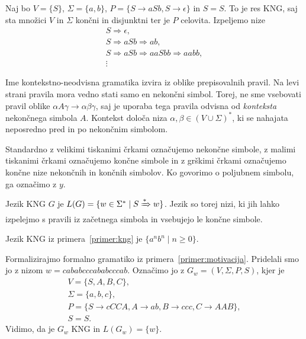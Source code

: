 \documentclass[fin1, tisk]{fmfdelo}
\theoremstyle{definition}
\begin{document}
\begin{primer}
    Naj bo $ V = \{ S\}$, 
    $\Sigma = \{ a,b \}$, 
    $P = \{ S \rightarrow aSb, S \rightarrow \epsilon \}$ in
    $S = S$.
    To je res KNG, saj sta množici $V$ in $\Sigma$ končni in disjunktni ter je $P$ celovita.
    Izpeljemo nize
    \begin{gather*}
        S \Rightarrow \epsilon, \\
        S \Rightarrow \mathit{aSb} \Rightarrow \mathit{ab}, \\
        S \Rightarrow \mathit{aSb} \Rightarrow \mathit{aaSbb} \Rightarrow \mathit{aabb}, \\
        \vdots
    \end{gather*}
\end{primer}

Ime kontekstno-neodvisna gramatika izvira iz oblike prepisovalnih pravil. Na levi strani 
pravila mora vedno stati samo en nekončni simbol. Torej, ne sme vsebovati pravil oblike 
$\alpha A \gamma \rightarrow \alpha\beta\gamma$, saj je uporaba tega pravila odvisna od 
\emph{konteksta} nekončnega simbola $A$. Kontekst določa niza 
$\alpha, \beta \in ( V \cup \Sigma )^*$, ki se nahajata neposredno pred in po nekončnim simbolom.

Standardno z velikimi tiskanimi črkami označujemo nekončne simbole, z malimi tiskanimi črkami 
označujemo končne simbole in z grškimi črkami označujemo končne nize nekončnih in končnih simbolov.
Ko govorimo o poljubnem simbolu, ga označimo z $y$.

\begin{definicija}\label{primer:kng}
    Jezik KNG $G$ je $L(G) = \{ w \in \Sigma^* \mid S \xRightarrow{*} w \}$. Jezik so torej nizi,
    ki jih lahko izpelejmo s pravili iz začetnega simbola in vsebujejo le končne simbole.
\end{definicija}

\begin{primer}
    Jezik KNG iz primera~\ref{primer:kng} je $\{ a^n b^n \mid n \geq 0 \}$.
\end{primer}

\begin{primer}
    Formalizirajmo formalno gramatiko iz primera~\ref{primer:motivacija}. Pridelali smo jo z nizom
    $w = \mathit{cababcccababcccab} $. Označimo jo z $ G_w = (V, \Sigma, P, S) $, kjer je 
    \begin{gather*}
        V = \{ S, A, B, C \}, \\
        \Sigma = \{ a, b, c \}, \\
        P = \{ S \rightarrow \mathit{cCCA}, A \rightarrow \mathit{ab}, B 
        \rightarrow \mathit{ccc}, C \rightarrow \mathit{AAB} \}, \\
        S = S.
    \end{gather*}
    Vidimo, da je $G_w$ KNG in $ L(G_w) = \{w\} $.
\end{primer}
\end{document}
